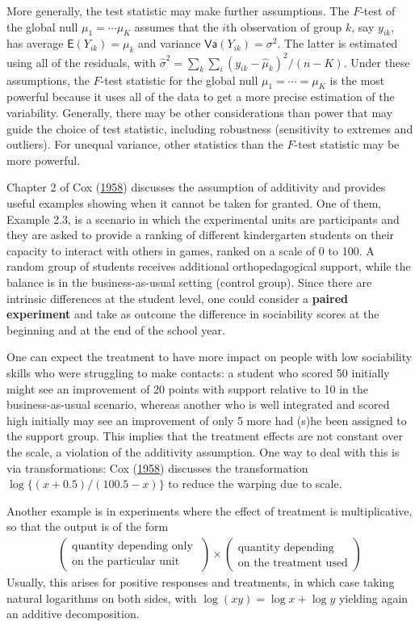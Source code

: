 \documentclass[
  11pt,
  letterpaper,
]{scrbook}
\theoremstyle{definition}
\theoremstyle{remark}
\begin{document}
More generally, the test statistic may make further assumptions. The
\(F\)-test of the global null \(\mu_1 = \cdots \mu_K\) assumes that the
\(i\)th observation of group \(k\), say \(y_{ik}\), has average
\(\mathsf{E}(Y_{ik}) = \mu_k\) and variance
\(\mathsf{Va}(Y_{ik}) = \sigma^2\). The latter is estimated using all of
the residuals, with
\(\widehat{\sigma}^2 = \sum_k\sum_i (y_{ik} - \widehat{\mu}_k)^2/(n-K)\).
Under these assumptions, the \(F\)-test statistic for the global null
\(\mu_1 = \cdots = \mu_K\) is the most powerful because it uses all of
the data to get a more precise estimation of the variability. Generally,
there may be other considerations than power that may guide the choice
of test statistic, including robustness (sensitivity to extremes and
outliers). For unequal variance, other statistics than the \(F\)-test
statistic may be more powerful.

Chapter 2 of Cox (\protect\hyperlink{ref-Cox:1958}{1958}) discusses the
assumption of additivity and provides useful examples showing when it
cannot be taken for granted. One of them, Example 2.3, is a scenario in
which the experimental units are participants and they are asked to
provide a ranking of different kindergarten students on their capacity
to interact with others in games, ranked on a scale of 0 to 100. A
random group of students receives additional orthopedagogical support,
while the balance is in the business-as-usual setting (control group).
Since there are intrinsic differences at the student level, one could
consider a \textbf{paired experiment} and take as outcome the difference
in sociability scores at the beginning and at the end of the school
year.

One can expect the treatment to have more impact on people with low
sociability skills who were struggling to make contacts: a student who
scored 50 initially might see an improvement of 20 points with support
relative to 10 in the business-as-usual scenario, whereas another who is
well integrated and scored high initially may see an improvement of only
5 more had (s)he been assigned to the support group. This implies that
the treatment effects are not constant over the scale, a violation of
the additivity assumption. One way to deal with this is via
transformations: Cox (\protect\hyperlink{ref-Cox:1958}{1958}) discusses
the transformation \(\log\{(x+0.5)/(100.5-x)\}\) to reduce the warping
due to scale.

Another example is in experiments where the effect of treatment is
multiplicative, so that the output is of the form \begin{align*}
\begin{pmatrix} \text{quantity depending only } \\ 
\text{on the particular unit} 
\end{pmatrix} \times
\begin{pmatrix} \text{quantity depending} \\
 \text{on the treatment used}\end{pmatrix}
\end{align*} Usually, this arises for positive responses and treatments,
in which case taking natural logarithms on both sides, with
\(\log(xy) = \log x + \log y\) yielding again an additive decomposition.
\end{document}
